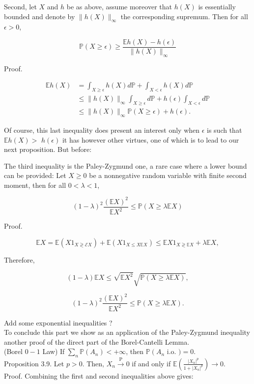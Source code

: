 \documentclass[11pt]{amsbook}
\theoremstyle{plain}%
\theoremstyle{definition}
\theoremstyle{remark}
\begin{document}
Second, let $X$ and $h$ be as above, assume moreover that $h(X)$ is essentially bounded and denote by $\|h(X)\|_{\infty}$ the corresponding supremum. Then for all $\epsilon>0$,

$$
\mathbb{P}(X \geq \epsilon) \geq \frac{\mathbb{E} h(X)-h(\epsilon)}{\|h(X)\|_{\infty}}
$$

Proof.

$$
\begin{aligned}
\mathbb{E} h(X) & =\int_{X \geq \epsilon} h(X) d \mathbb{P}+\int_{X<\epsilon} h(X) d \mathbb{P} \\
& \leq\|h(X)\|_{\infty} \int_{X \geq \epsilon} d \mathbb{P}+h(\epsilon) \int_{X<\epsilon} d \mathbb{P} \\
& \leq\|h(X)\|_{\infty} \mathbb{P}(X \geq \epsilon)+h(\epsilon) .
\end{aligned}
$$

Of course, this last inequality does present an interest only when $\epsilon$ is such that $\mathbb{E} h(X)>$ $h(\epsilon)$ it has however other virtues, one of which is to lead to our next proposition. But before:

The third inequality is the Paley-Zygmund one, a rare case where a lower bound can be provided: Let $X \geq 0$ be a nonnegative random variable with finite second moment, then for all $0<\lambda<1$,

$$
(1-\lambda)^{2} \frac{(\mathbb{E} X)^{2}}{\mathbb{E} X^{2}} \leq \mathbb{P}(X \geq \lambda \mathbb{E} X)
$$

Proof.

$$
\mathbb{E} X=\mathbb{E}\left(X 1_{X \gtrless \mathcal{E} X}\right)+\mathbb{E}\left(X 1_{X \leq X \mathbb{E} X}\right) \leq \mathbb{E} X 1_{X \gtrless \mathbb{E} X}+\lambda \mathbb{E} X,
$$

Therefore,

$$
(1-\lambda) \mathbb{E} X \leq \sqrt{\mathbb{E} X^{2}} \sqrt{\mathbb{P}(X \geq \lambda \mathbb{E} X)},
$$

$$
(1-\lambda)^{2} \frac{(\mathbb{E} X)^{2}}{\mathbb{E} X^{2}} \leq \mathbb{P}(X \geq \lambda \mathbb{E} X) .
$$

Add some exponential inequalities ?\\
To conclude this part we show as an application of the Paley-Zygmund inequality another proof of the direct part of the Borel-Cantelli Lemma.\\
(Borel $0-1$ Law) If $\sum_{n} \mathbb{P}\left(A_{n}\right)<+\infty$, then $\mathbb{P}\left(A_{n}\right.$ i.o. $)=0$.\\
Proposition 3.9. Let $p>0$. Then, $X_{n} \xrightarrow{\mathrm{P}} 0$ if and only if $\mathbb{E}\left(\frac{\left|X_{n}\right|^{p}}{1+\left|X_{n}\right|^{p}}\right) \rightarrow 0$.\\
Proof. Combining the first and second inequalities above gives:
\end{document}
